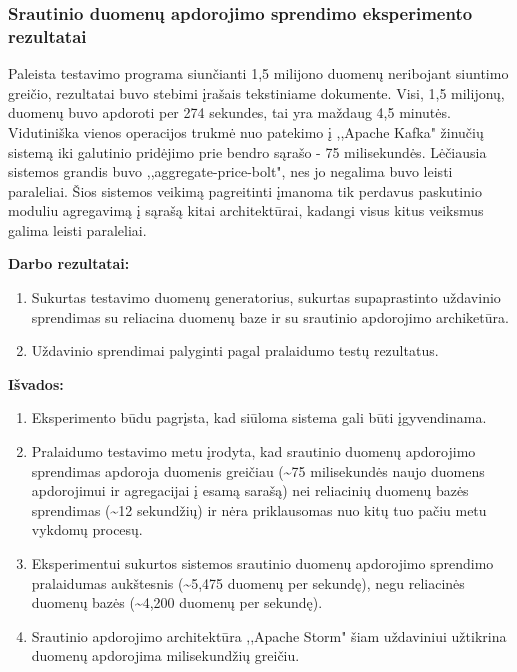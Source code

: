 \documentclass{VUMIFPSkursinis}
\begin{document}
\subsubsection{Srautinio duomenų apdorojimo sprendimo eksperimento rezultatai}
Paleista testavimo programa siunčianti 1,5 milijono duomenų neribojant siuntimo greičio, rezultatai buvo stebimi įrašais tekstiniame dokumente.
Visi, 1,5 milijonų, duomenų buvo apdoroti per 274 sekundes, tai yra maždaug 4,5 minutės. Vidutiniška vienos operacijos trukmė nuo 
patekimo į ,,Apache Kafka" žinučių sistemą iki galutinio pridėjimo prie bendro sąrašo - 75 milisekundės.
Lėčiausia sistemos grandis buvo ,,aggregate-price-bolt", nes jo negalima buvo leisti paraleliai. Šios sistemos veikimą pagreitinti 
įmanoma tik perdavus paskutinio moduliu agregavimą į sąrašą kitai architektūrai, kadangi visus kitus veiksmus galima leisti paraleliai.


\textbf{Darbo rezultatai:}
\vspace{1 mm}

    \begin{enumerate}
        \item Sukurtas testavimo duomenų generatorius, sukurtas supaprastinto uždavinio sprendimas su reliacina duomenų baze ir su srautinio apdorojimo archiketūra.
        \item Uždavinio sprendimai palyginti pagal pralaidumo testų rezultatus.
    \end{enumerate}
    \vspace{1 mm}

\textbf{Išvados:}
\vspace{1 mm}

    \begin{enumerate}
    \item Eksperimento būdu pagrįsta, kad siūloma sistema gali būti įgyvendinama.
    \item Pralaidumo testavimo metu įrodyta, kad srautinio duomenų apdorojimo sprendimas apdoroja duomenis greičiau 
    (\textasciitilde75 milisekundės naujo duomens apdorojimui ir agregacijai į esamą sarašą) nei reliacinių duomenų
    bazės sprendimas (\textasciitilde12 sekundžių) ir nėra priklausomas nuo kitų tuo pačiu metu vykdomų procesų.
    \item Eksperimentui sukurtos sistemos srautinio duomenų apdorojimo sprendimo pralaidumas aukštesnis 
    (\textasciitilde5,475 duomenų per sekundę), negu reliacinės duomenų bazės (\textasciitilde 4,200 duomenų per sekundę). 
    \item Srautinio apdorojimo architektūra ,,Apache Storm" šiam uždaviniui užtikrina duomenų apdorojima milisekundžių greičiu.  

    \end{enumerate}

\printbibliography[heading=bibintoc] 
\end{document}

